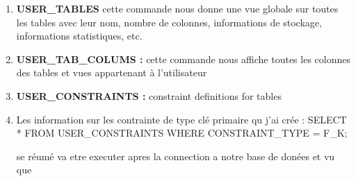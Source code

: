 \begin{enumerate}
\begin{itemize}
       \end{itemize}
    \item \textbf{USER\_TABLES} cette commande nous donne une vue globale sur toutes les tables avec leur nom, nombre de colonnes,
     informations de stockage, informations statistiques, etc.
    \item \textbf{USER\_TAB\_COLUMS :} cette commande nous affiche toutes les colonnes des tables et vues appartenant à l’utilisateur
    \item \textbf{USER\_CONSTRAINTS :} constraint definitions for tables 
    \item Les information sur les contrainte de type clé primaire qu j'ai crée :
          SELECT * FROM USER\_CONSTRAINTS
          WHERE CONSTRAINT\_TYPE = F\_K;

  \par se réumé va etre executer apres la connection a notre base de donées et vu que 
    
\end{enumerate}
        

